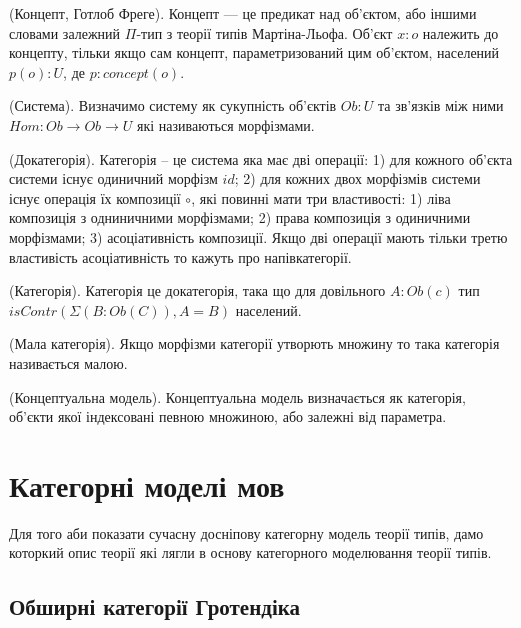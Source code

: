 \begin{definition} (Концепт, Готлоб Фреге).
Концепт --- це предикат над об'єктом, або іншими словами залежний $\Pi$-тип з теорії типів Мартіна-Льофа.
Об'єкт $x : o$ належить до концепту, тільки якщо сам концепт,
параметризований цим об'єктом, населений $p(o) : U$, де $p : concept(o)$.
\end{definition}

\begin{definition} (Система).
Визначимо систему як сукупність об'єктів $Ob : U$
та зв'язків між ними $Hom : Ob \rightarrow Ob \rightarrow U$ які називаються морфізмами.
\end{definition}

\begin{definition} (Докатегорія).
Категорія -- це система яка має дві операції:
1) для кожного об'єкта системи існує одиничний морфізм $id$;
2) для кожних двох морфізмів системи існує операція їх композиції $\circ$,
які повинні мати три властивості:
1) ліва композиція з одниничними морфізмами;
2) права композиція з одиничними морфізмами;
3) асоціативність композиції. Якщо дві операції
мають тільки третю властивість асоціативність то кажуть про напівкатегорії.
\end{definition}

\begin{definition} (Категорія).
Категорія це докатегорія, така що для довільного $A: Ob(c)$
тип $isContr(\Sigma(B:Ob(C)),A=B)$ населений.
\end{definition}

\begin{definition} (Мала категорія).
Якщо морфізми категорії утворють множину то така категорія називається малою.
\end{definition}

\begin{definition} (Концептуальна модель).
Концептуальна модель визначається як категорія, об'єкти якої індексовані певною множиною, або залежні від параметра.
\end{definition}

\section{Категорні моделі мов}
Для того аби показати сучасну досніпову категорну модель теорії типів,
дамо которкий опис теорії які лягли в основу категорного моделювання теорії типів.

\newpage
\subsection{Обширні категорії Гротендіка}

